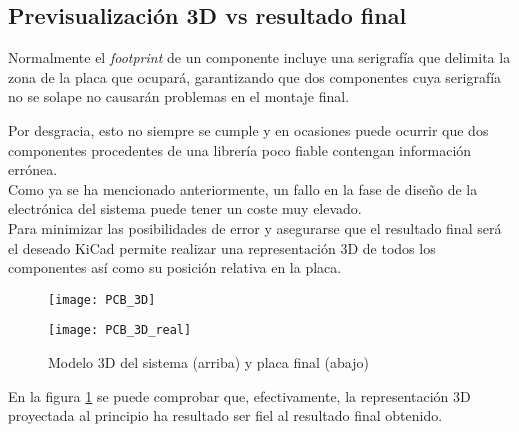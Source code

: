 \subsection{Previsualización 3D vs resultado final\label{sec:Modelo_3D}}

Normalmente el \textit{footprint} de un componente incluye una serigrafía que delimita la zona de la placa que ocupará, garantizando que dos componentes cuya serigrafía no se solape no causarán problemas en el montaje final.

Por desgracia, esto no siempre se cumple y en ocasiones puede ocurrir que dos componentes procedentes de una librería poco fiable contengan información errónea. 
\\Como ya se ha mencionado anteriormente, un fallo en la fase de diseño de la electrónica del sistema puede tener un coste muy elevado. \\Para minimizar las posibilidades de error y asegurarse que el resultado final será el deseado KiCad permite realizar una representación 3D de todos los componentes así como su posición relativa en la placa.


\begin{figure} [h]
    \centering
    \texttt{[image: PCB\_3D]}

    \texttt{[image: PCB\_3D\_real]}
    \caption{Modelo 3D del sistema (arriba) y placa final (abajo)}
    \label{fig:Comparativa_PCB_final}
\end{figure}

En la figura \ref{fig:Comparativa_PCB_final} se puede comprobar que, efectivamente, la representación 3D proyectada al principio ha resultado ser fiel al resultado final obtenido.

